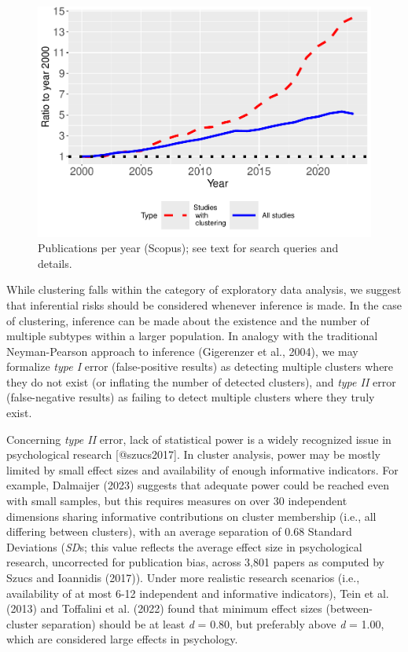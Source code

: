 \documentclass[
  man,floatsintext]{apa7}
\begin{document}
\begin{figure}

{\centering \includegraphics{paper_files/figure-latex/figure-literature-trends-1} 

}

\caption{Publications per year (Scopus); see text for search queries and details.}\label{fig:figure-literature-trends}
\end{figure}

While clustering falls within the category of exploratory data analysis, we suggest that inferential risks should be considered whenever inference is made. In the case of clustering, inference can be made about the existence and the number of multiple subtypes within a larger population. In analogy with the traditional Neyman-Pearson approach to inference (Gigerenzer et al., 2004), we may formalize \emph{type I} error (false-positive results) as detecting multiple clusters where they do not exist (or inflating the number of detected clusters), and \emph{type II} error (false-negative results) as failing to detect multiple clusters where they truly exist.

Concerning \emph{type II} error, lack of statistical power is \color{red} a widely recognized issue in psychological research \color{black}[@szucs2017]. In cluster analysis, power may be mostly limited by small effect sizes and availability of enough informative indicators. For example, Dalmaijer (2023) suggests that adequate power could be reached even with small samples, but this requires measures on over 30 independent dimensions sharing informative contributions on cluster membership (i.e., all differing between clusters), with an average separation of 0.68 Standard Deviations (\emph{SD}s; \color{red} this value reflects \color{black} the average effect size in psychological research, uncorrected for publication bias, across 3,801 papers as computed by Szucs and Ioannidis (2017)). Under more realistic research scenarios (i.e., availability of at most 6-12 independent \color{red} and informative \color{black} indicators), Tein et al. (2013) and Toffalini et al. (2022) found that minimum effect sizes (between-cluster separation) should be at least \emph{d} = 0.80, but preferably above \emph{d} = 1.00, which are considered large effects in psychology.
\end{document}
